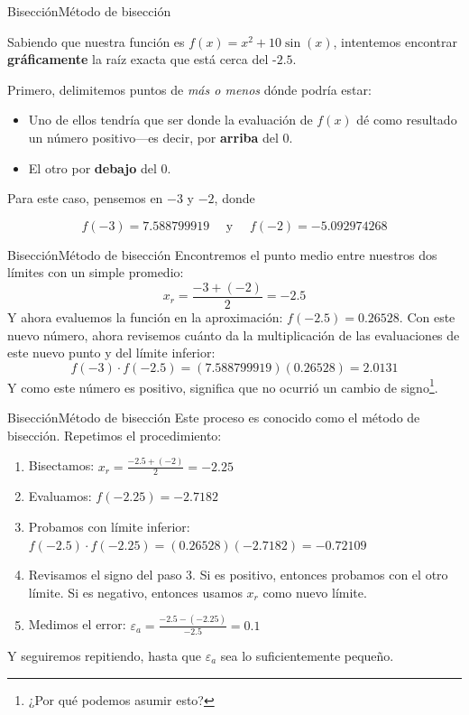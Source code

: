 \documentclass[spanish, c]{beamer}
\begin{document}
\begin{frame}{Bisección}{Método de bisección}

Sabiendo que nuestra función es $f(x) = x^2 + 10 \sin(x)$, intentemos encontrar \textbf{gráficamente} la raíz exacta que está cerca del -$2.5$. \pause

\bigskip

Primero, delimitemos puntos de \textit{más o menos} dónde podría estar: \pause

\begin{itemize}
    \item Uno de ellos tendría que ser donde la evaluación de $f(x)$ dé como resultado un número positivo---es decir, por \textbf{arriba} del 0. \pause
    \item El otro por \textbf{debajo} del 0.
\end{itemize} \pause

\bigskip

Para este caso, pensemos en $-3$ y $-2$, donde

$$f(-3) = 7.588799919 \quad \text{ y } \quad f(-2) = -5.092974268$$

\end{frame}

\begin{frame}{Bisección}{Método de bisección}
    Encontremos el punto medio entre nuestros dos límites con un simple promedio:
    $$x_r = \frac{-3 + (-2)}{2} = -2.5$$ \pause
    \bigskip
    Y ahora evaluemos la función en la aproximación: $f(-2.5) = 0.26528$. \pause
    \bigskip
    Con este nuevo número, ahora revisemos cuánto da la multiplicación de las evaluaciones de este nuevo punto y del límite inferior:
    $$f(-3) \cdot f(-2.5) = (7.588799919)(0.26528) = 2.0131$$ \pause
    Y como este número es positivo, significa que no ocurrió un cambio de signo\footnote{¿Por qué podemos asumir esto?}.
\end{frame}

\begin{frame}{Bisección}{Método de bisección}
    Este proceso es conocido como el \alert{método de bisección}.
    Repetimos el procedimiento:

    \begin{enumerate}[<+->]
        \item Bisectamos: $x_r = \frac{-2.5 + (-2)}{2} = -2.25$
        \item Evaluamos: $f(-2.25) = -2.7182$
        \item Probamos con límite inferior: $f(-2.5) \cdot f(-2.25) = (0.26528)(-2.7182) = -0.72109$
        \item Revisamos el signo del paso 3. Si es positivo, entonces probamos con el otro límite. Si es negativo, entonces usamos $x_r$ como nuevo límite.
        \item Medimos el error: $\varepsilon_a = \frac{-2.5 - (-2.25)}{-2.5} = 0.1$
    \end{enumerate} \pause
    
    Y seguiremos repitiendo, hasta que $\varepsilon_a$ sea lo suficientemente pequeño.
\end{frame}
\end{document}
